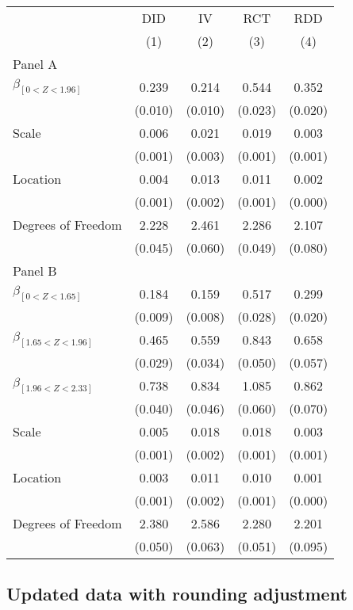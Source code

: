 \documentclass[
]{article}
\begin{document}
\def\sym#1{\ifmmode^{#1}\else\(^{#1}\)\fi} \begin{tabular}{l*{4}{c}} \hline\hline & \multicolumn{1}{c}{DID} &  \multicolumn{1}{c}{IV} &  \multicolumn{1}{c}{RCT} &  \multicolumn{1}{c}{RDD}\\  & \multicolumn{1}{c}{(1)} &  \multicolumn{1}{c}{(2)} &  \multicolumn{1}{c}{(3)} &  \multicolumn{1}{c}{(4)}\\  \hline \hline  Panel A \\  $\beta_{[0 < Z < 1.96]}$ & 0.239 &  0.214 &  0.544 &  0.352\\ & (0.010) &  (0.010) &  (0.023) &  (0.020)\\  Scale & 0.006 &  0.021 &  0.019 &  0.003\\ & (0.001) &  (0.003) &  (0.001) &  (0.001) \\  Location & 0.004 &  0.013 &  0.011 &  0.002\\ & (0.001) &  (0.002) &  (0.001) &  (0.000) \\  Degrees of Freedom & 2.228 &  2.461 &  2.286 &  2.107\\ & (0.045) &  (0.060) &  (0.049) &  (0.080)\\ Panel B \\  $\beta_{[0 < Z < 1.65]}$ & 0.184 &  0.159 &  0.517 &  0.299\\ & (0.009) &  (0.008) &  (0.028) &  (0.020)\\  $\beta_{[1.65 < Z < 1.96]}$ & 0.465 &  0.559 &  0.843 &  0.658\\ & (0.029) &  (0.034) &  (0.050) &  (0.057)\\   $\beta_{[1.96 < Z < 2.33]}$ & 0.738 &  0.834 &  1.085 &  0.862\\ & (0.040) &  (0.046) &  (0.060) &  (0.070)\\  Scale & 0.005 &  0.018 &  0.018 &  0.003\\ & (0.001) &  (0.002) &  (0.001) &  (0.001) \\  Location & 0.003 &  0.011 &  0.010 &  0.001\\ & (0.001) &  (0.002) &  (0.001) &  (0.000) \\  Degrees of Freedom & 2.380 &  2.586 &  2.280 &  2.201\\ & (0.050) &  (0.063) &  (0.051) &  (0.095)\\  \hline\hline \end{tabular}

\hypertarget{updated-data-with-rounding-adjustment}{%
\subsection{Updated data with rounding
adjustment}\label{updated-data-with-rounding-adjustment}}
\end{document}
